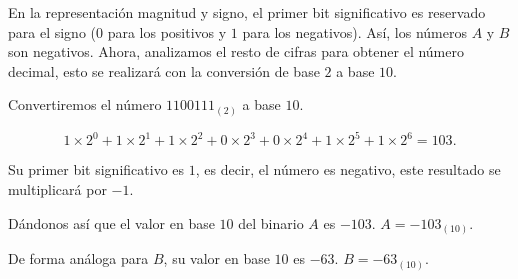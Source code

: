 \begin{frame}
\begin{solution}
\begin{enumerate}[a)]
			      En la representación magnitud y signo, el primer bit
			      significativo es reservado para el signo
			      ($0$ para los positivos y $1$ para los negativos).
			      Así, los números $A$ y $B$ son negativos.
			      Ahora, analizamos el resto de cifras para obtener el
			      número decimal, esto se realizará con la conversión de
			      base $2$ a base $10$.

			      Convertiremos el número ${1100111}_{\left(2\right)}$ a
			      base $10$.

			      \begin{equation*}
				      1\times 2^{0}+
				      1\times2^{1}+
				      1\times2^{2}+
				      0\times2^{3}+
				      0\times2^{4}+
				      1\times2^{5}+
				      1\times2^{6}=
				      103.
			      \end{equation*}

			      Su primer bit significativo es $1$, es decir, el número
			      es negativo, este resultado se multiplicará por $-1$.

			      Dándonos así que el valor en base $10$ del binario $A$ es
			      $-103$.
			      $A=-{103}_{\left(10\right)}$.

			      De forma análoga para $B$, su valor en base $10$ es $-63$.
			      $B=-{63}_{\left(10\right)}$.
		\end{enumerate}
	\end{solution}
\end{frame}

